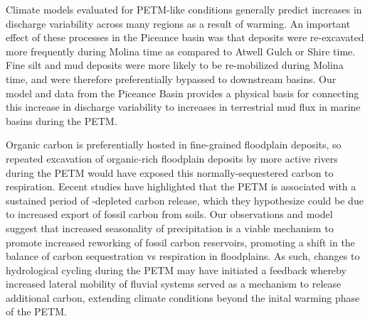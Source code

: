 \documentclass[draft]{compact_proposal}\usepackage[]{graphicx}\usepackage[]{color}
\newcommand{\del}[3]{\ce{\delta^#1#2_{#3}}}
\begin{document}
Climate models evaluated for PETM-like conditions generally predict increases in discharge variability across many regions as a result of warming. 
An important effect of these processes in the Piceance basin was that deposits were re-excavated more frequently during Molina time as compared to Atwell Gulch or Shire time.
Fine silt and mud deposits were more likely to be re-mobilized during Molina time, and were therefore preferentially bypassed to downstream basins.
Our model and data from the Piceance Basin provides a physical basis for connecting this increase in discharge variability to increases in terrestrial mud flux in marine basins during the PETM.

Organic carbon is preferentially hosted in fine-grained floodplain deposits, so repeated excavation of organic-rich floodplain deposits by more active rivers during the PETM would have exposed this normally-sequestered carbon to respiration.
Eecent studies have highlighted that the PETM is associated with a sustained period of \del{13}{C}{}-depleted carbon release, which they hypothesize could be due to increased export of fossil carbon from soils.
Our observations and model suggest that increased seasonality of precipitation is a viable mechanism to promote increased reworking of fossil carbon reservoirs, promoting a shift in the balance of carbon sequestration vs respiration in floodplains.
As such, changes to hydrological cycling during the PETM may have initiated a feedback whereby increased lateral mobility of fluvial systems served as a mechanism to release additional carbon, extending climate conditions beyond the inital warming phase of the PETM. 
\end{document}
